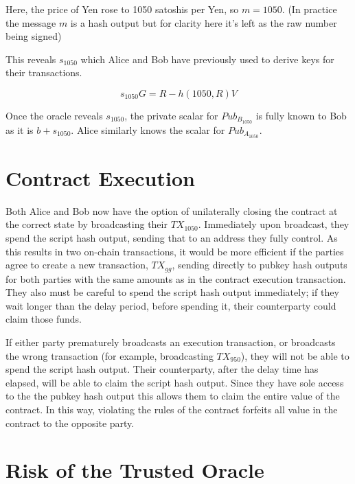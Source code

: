 \documentclass[11pt]{article}
\begin{document}
Here, the price of Yen rose to 1050 satoshis per Yen, so \(m = 1050\).  (In practice the message \(m\) is a hash output but for clarity here it's left as the raw number being signed)


This reveals \(s_{1050}\) which Alice and Bob have previously used to derive keys for their transactions.

\[s_{1050}G = R - h(1050, R)V\]

Once the oracle reveals \(s_{1050}\), the private scalar for \(Pub_{B_{1050}}\) is fully known to Bob as it is \(b + s_{1050}\).  Alice similarly knows the scalar for \(Pub_{A_{1050}}\). 

\section*{Contract Execution}

Both Alice and Bob now have the option of unilaterally closing the contract at the correct state by broadcasting their \(TX_{1050}\).  Immediately upon broadcast, they spend the script hash output, sending that to an address they fully control.  As this results in two on-chain transactions, it would be more efficient if the parties agree to create a new transaction, \(TX_{gg}\), sending directly to pubkey hash outputs for both parties with the same amounts as in the contract execution transaction.  They also must be careful to spend the script hash output immediately; if they wait longer than the delay period, before spending it, their counterparty could claim those funds.

If either party prematurely broadcasts an execution transaction, or broadcasts the wrong transaction (for example, broadcasting \(TX_{950}\)), they will not be able to spend the script hash output.  Their counterparty, after the delay time has elapsed, will be able to claim the script hash output.  Since they have sole access to the the pubkey hash output this allows them to claim the entire value of the contract.  In this way, violating the rules of the contract forfeits all value in the contract to the opposite party.

\section*{Risk of the Trusted Oracle}
\end{document}
